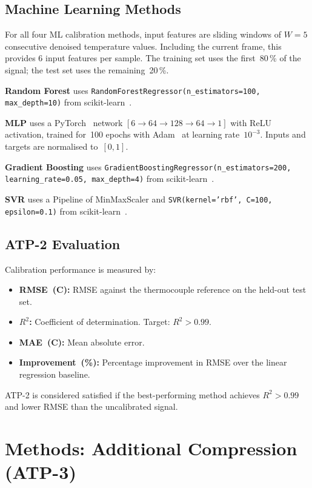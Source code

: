 \subsection{Machine Learning Methods}

For all four ML calibration methods, input features are sliding windows of $W=5$ consecutive denoised temperature values. Including the current frame, this provides 6 input features per sample. The training set uses the first~80\,\% of the signal; the test set uses the remaining~20\,\%.

\textbf{Random Forest} uses \texttt{RandomForestRegressor(n\_estimators=100, max\_depth=10)} from scikit-learn~\cite{scikit-learn, random_forest_breiman}.

\textbf{MLP} uses a PyTorch~\cite{pytorch} network $[6\!\rightarrow\!64\!\rightarrow\!128\!\rightarrow\!64\!\rightarrow\!1]$ with ReLU activation, trained for~100 epochs with Adam~\cite{kingma2014adam} at learning rate~$10^{-3}$. Inputs and targets are normalised to~$[0,1]$.

\textbf{Gradient Boosting} uses \texttt{GradientBoostingRegressor(n\_estimators=200, learning\_rate=0.05, max\_depth=4)} from scikit-learn~\cite{scikit-learn}.

\textbf{SVR} uses a Pipeline of MinMaxScaler and \texttt{SVR(kernel='rbf', C=100, epsilon=0.1)} from scikit-learn~\cite{scikit-learn}.

\subsection{ATP-2 Evaluation}

Calibration performance is measured by:
\begin{itemize}[leftmargin=2em, nosep]
\item \textbf{RMSE~(\textdegree C):} RMSE against the thermocouple reference on the held-out test set.
\item \textbf{$R^2$:} Coefficient of determination. Target: $R^2 > 0.99$.
\item \textbf{MAE~(\textdegree C):} Mean absolute error.
\item \textbf{Improvement~(\%):} Percentage improvement in RMSE over the linear regression baseline.
\end{itemize}

ATP-2 is considered satisfied if the best-performing method achieves $R^2 > 0.99$ and lower RMSE than the uncalibrated signal.

\section{Methods: Additional Compression (ATP-3)}
\label{sec:method_compress}

